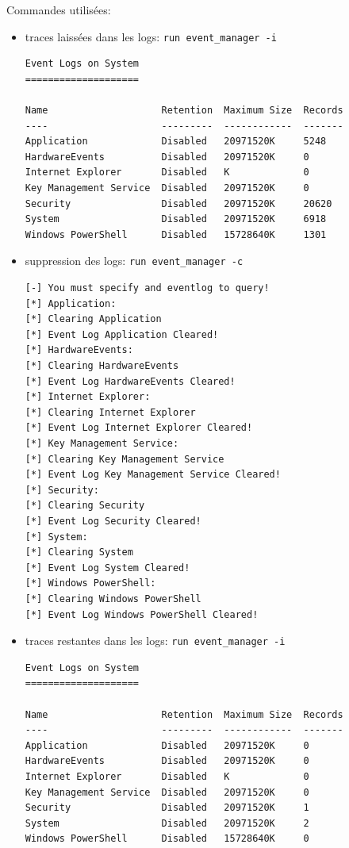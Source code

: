 \documentclass[a4paper]{article}
\begin{document}
Commandes utilisées:
\begin{itemize}
    \item traces laissées dans les logs: \texttt{\footnotesize run event\_manager -i}
    \begin{example}
\begin{Verbatim}[fontsize=\footnotesize]
Event Logs on System
====================

Name                    Retention  Maximum Size  Records
----                    ---------  ------------  -------
Application             Disabled   20971520K     5248
HardwareEvents          Disabled   20971520K     0
Internet Explorer       Disabled   K             0
Key Management Service  Disabled   20971520K     0
Security                Disabled   20971520K     20620
System                  Disabled   20971520K     6918
Windows PowerShell      Disabled   15728640K     1301
\end{Verbatim}
    \end{example}
    \item suppression des logs: \texttt{\footnotesize run event\_manager -c}
    \begin{example}
\begin{Verbatim}[fontsize=\footnotesize]
[-] You must specify and eventlog to query!
[*] Application: 
[*] Clearing Application
[*] Event Log Application Cleared!
[*] HardwareEvents: 
[*] Clearing HardwareEvents
[*] Event Log HardwareEvents Cleared!
[*] Internet Explorer: 
[*] Clearing Internet Explorer
[*] Event Log Internet Explorer Cleared!
[*] Key Management Service: 
[*] Clearing Key Management Service
[*] Event Log Key Management Service Cleared!
[*] Security: 
[*] Clearing Security
[*] Event Log Security Cleared!
[*] System: 
[*] Clearing System
[*] Event Log System Cleared!
[*] Windows PowerShell: 
[*] Clearing Windows PowerShell
[*] Event Log Windows PowerShell Cleared!
\end{Verbatim}
    \end{example}
    \item traces restantes dans les logs: \texttt{\footnotesize run event\_manager -i}
    \begin{example}
\begin{Verbatim}[fontsize=\footnotesize]
Event Logs on System
====================

Name                    Retention  Maximum Size  Records
----                    ---------  ------------  -------
Application             Disabled   20971520K     0
HardwareEvents          Disabled   20971520K     0
Internet Explorer       Disabled   K             0
Key Management Service  Disabled   20971520K     0
Security                Disabled   20971520K     1
System                  Disabled   20971520K     2
Windows PowerShell      Disabled   15728640K     0
\end{Verbatim}
    \end{example}
\end{itemize}
\end{document}
